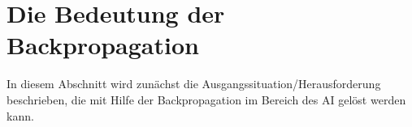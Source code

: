 \chapter{Die Bedeutung der Backpropagation}
In diesem Abschnitt wird zunächst die Ausgangssituation/Herausforderung beschrieben, die mit Hilfe der Backpropagation im Bereich des AI gelöst werden kann.
